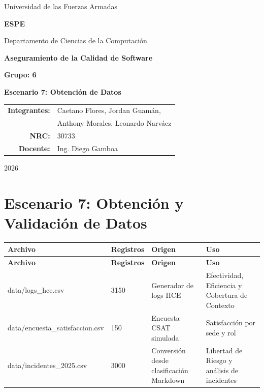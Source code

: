 \documentclass[11pt]{article}
\begin{document}
\begin{titlepage}
\centering
{\Large Universidad de las Fuerzas Armadas\par}
{\LARGE \textbf{ESPE}\par}
\vspace{0.35cm}
{\large Departamento de Ciencias de la Computación\par}
\vspace{1.5cm}
{\Large \textbf{Aseguramiento de la Calidad de Software}\par}
\vspace{0.5cm}
{\large \textbf{Grupo: 6}\par}
\vspace{1.2cm}
{\Large \textbf{Escenario 7: Obtención de Datos}\par}
\vfill
\begin{tabular}{rl}
\textbf{Integrantes:} & Caetano Flores, Jordan Guamán,\\
& Anthony Morales, Leonardo Narváez\\
\textbf{NRC:} & 30733\\
\textbf{Docente:} & Ing. Diego Gamboa\\
\end{tabular}
\vfill
{\large 2026\par}
\end{titlepage}

\section*{Escenario 7: Obtención y Validación de Datos}

\small
\begin{longtable}{p{} p{} p{} p{}}
\toprule
\textbf{Archivo} & \textbf{Registros} & \textbf{Origen} & \textbf{Uso} \\
\midrule
\endfirsthead
\toprule
\textbf{Archivo} & \textbf{Registros} & \textbf{Origen} & \textbf{Uso} \\
\midrule
\endhead
data/logs\_hce.csv & 3150 & Generador de logs HCE & Efectividad, Eficiencia y Cobertura de Contexto \\
data/encuesta\_satisfaccion.csv & 150 & Encuesta CSAT simulada & Satisfacción por sede y rol \\
data/incidentes\_2025.csv & 3000 & Conversión desde clasificación Markdown & Libertad de Riesgo y análisis de incidentes \\
\bottomrule
\end{longtable}
\normalsize
\end{document}
